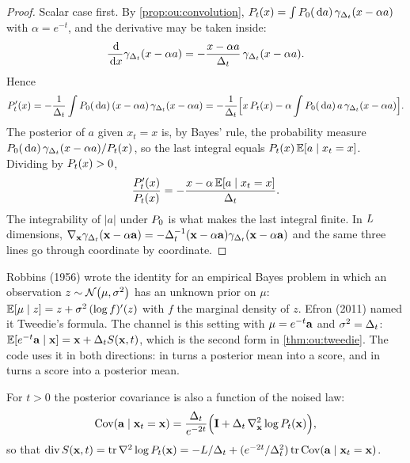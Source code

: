 \begin{proof}
Scalar case first. By \cref{prop:ou:convolution},
$P_t(x)=\int P_0(\,\mathrm{d} a)\,\gamma_{\Delta_t}(x-\alpha a)$ with $\alpha=e^{-t}$, and the
derivative may be taken inside:
\[
  \frac{\,\mathrm{d}}{\,\mathrm{d} x}\gamma_{\Delta_t}(x-\alpha a)=-\frac{x-\alpha a}{\Delta_t}\,\gamma_{\Delta_t}(x-\alpha a).
\]
Hence
\[
  P_t'(x)=-\frac1{\Delta_t}\int P_0(\,\mathrm{d} a)\,(x-\alpha a)\,\gamma_{\Delta_t}(x-\alpha a)
         =-\frac1{\Delta_t}\Bigl[x\,P_t(x)-\alpha\int P_0(\,\mathrm{d} a)\,a\,\gamma_{\Delta_t}(x-\alpha a)\Bigr].
\]
The posterior of $a$ given $x_t=x$ is, by Bayes' rule, the probability measure
$P_0(\,\mathrm{d} a)\,\gamma_{\Delta_t}(x-\alpha a)/P_t(x)$, so the last integral equals
$P_t(x)\,\mathbb{E}[a\mid x_t=x]$. Dividing by $P_t(x)>0$,
\[
  \frac{P_t'(x)}{P_t(x)}=-\frac{x-\alpha\,\mathbb{E}[a\mid x_t=x]}{\Delta_t}.
\]
The integrability of $|a|$ under $P_0$ is what makes the last integral finite. In
$L$ dimensions, $\nabla_{\mathbf{x}}\gamma_{\Delta_t}(\mathbf{x}-\alpha\mathbf{a})=-\Delta_t^{-1}(\mathbf{x}-\alpha\mathbf{a})\gamma_{\Delta_t}(\mathbf{x}-\alpha\mathbf{a})$
and the same three lines go through coordinate by coordinate.
\end{proof}

\begin{remark}
\label{rem:ou:robbins}
Robbins (1956) wrote the identity for an empirical Bayes problem in which an observation
$z\sim\mathcal{N}\!\left(\mu,\sigma^2\right)$ has an unknown prior on $\mu$: $\mathbb{E}[\mu\mid z]=z+\sigma^2\,(\log f)'(z)$
with $f$ the marginal density of $z$. Efron (2011) named it Tweedie's formula. The
channel is this setting with $\mu=e^{-t}\mathbf{a}$ and $\sigma^2=\Delta_t$:
$\mathbb{E}[e^{-t}\mathbf{a}\mid\mathbf{x}]=\mathbf{x}+\Delta_tS(\mathbf{x},t)$, which is the second form in
\cref{thm:ou:tweedie}. The code uses it in both directions:  in
 turns a posterior mean into a score, and
 in  turns a score into a
posterior mean.
\end{remark}

\begin{proposition}
\label{prop:ou:tweedie2}
For $t>0$ the posterior covariance is also a function of the noised law:
\begin{equation}
  \operatorname{Cov}(\mathbf{a}\mid\mathbf{x}_t=\mathbf{x})=\frac{\Delta_t}{e^{-2t}}\Bigl(\mathbf{I}+\Delta_t\,\nabla^2_{\mathbf{x}}\log P_t(\mathbf{x})\Bigr),
  \label{eq:ou:tweedie2}
\end{equation}
so that $\operatorname{div}S(\mathbf{x},t)=\operatorname{tr}\nabla^2\log P_t(\mathbf{x})=-L/\Delta_t+(e^{-2t}/\Delta_t^2)\operatorname{tr}\operatorname{Cov}(\mathbf{a}\mid\mathbf{x}_t=\mathbf{x})$.
\end{proposition}

